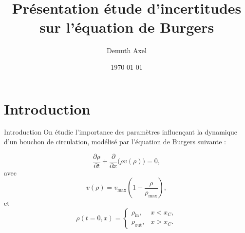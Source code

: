 \documentclass[10pt]{beamer}
\title{Présentation étude d'incertitudes sur l'équation de Burgers}
\author{Demuth Axel}
\date{\today}
\begin{document}
\maketitle

\section{Introduction}
\begin{frame}{Introduction}
    On étudie l'importance des paramètres influençant la dynamique d'un bouchon de circulation, modélisé par l'équation de Burgers suivante : 

    \begin{equation}
        \frac{\partial \rho}{\partial t} + \frac{\partial}{\partial x} \big(\rho v(\rho)\big) = 0,
        \end{equation}
        avec 
        \begin{equation}
        v(\rho) = v_{\text{max}} \left( 1 - \frac{\rho}{\rho_{\text{max}}} \right),
        \end{equation}
        et 
        \begin{equation}
        \rho(t = 0, x) =
        \begin{cases} 
        \rho_{\text{in}}, & x < x_C, \\
        \rho_{\text{out}}, & x > x_C.
        \end{cases}
    \end{equation}
        
\end{frame}
\end{document}
